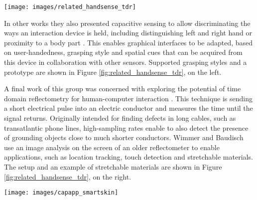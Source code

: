 \begin{minipage}{\linewidth}
\centering
\texttt{[image: images/related\_handsense\_tdr]}
\label{fig:related_handsense_tdr}
\end{minipage}

In other works they also presented capacitive sensing to allow discriminating the ways an interaction device is held, including distinguishing left and right hand or proximity to a body part \cite{ wimmer2009handsense}. This enables graphical interfaces to be adapted, based on user-handedness, grasping style and spatial cues that can be acquired from this device in collaboration with other sensors. Supported grasping styles and a prototype are shown in Figure \ref{fig:related_handsense_tdr}, on the left.

A final work of this group was concerned with exploring the potential of time domain reflectometry for human-computer interaction \cite{wimmer2011modular}. This technique is sending a short electrical pulse into an electric conductor and measures the time until the signal returns. Originally intended for finding defects in long cables, such as transatlantic phone lines, high-sampling rates enable to also detect the presence of grounding objects close to much shorter conductors. Wimmer and Baudisch use an image analysis on the screen of an older reflectometer to enable applications, such as location tracking, touch detection and stretchable materials. The setup and an example of stretchable materials are shown in Figure \ref{fig:related_handsense_tdr}, on the right.

\begin{minipage}{\linewidth}
\centering
\texttt{[image: images/capapp\_smartskin]}
\label{fig:capapp_smartskin}
\end{minipage}

